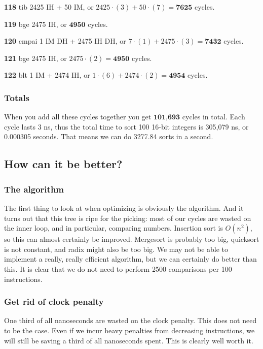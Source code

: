 \documentclass[a4paper]{article}
\begin{document}
\textbf{118} tib 2425 IH + 50 IM, or $2425 \cdot (3) + 50 \cdot (7) = \mathbf{7625}$ cycles.

\textbf{119} bge 2475 IH, or $\mathbf{4950}$ cycles.

\textbf{120} cmpai 1 IM DH + 2475 IH DH, or $7 \cdot (1) + 2475 \cdot (3) = \mathbf{7432}$ cycles.

\textbf{121} bge 2475 IH, or $2475 \cdot (2) = \mathbf{4950}$ cycles.

\textbf{122} blt 1 IM + 2474 IH, or $1 \cdot (6) + 2474 \cdot (2) = \mathbf{4954}$ cycles. \\

\subsubsection{\large Totals}

When you add all these cycles together you get $\textbf{101,693}$ cycles in total. Each cycle lasts 3 ns, thus the total time to sort 100 16-bit integers is 305,079 ns, or 0.000305 seconds. That means we can do 3277.84 sorts in a second.

\subsection{How can it be better?}

\subsubsection{The algorithm}

The first thing to look at when optimizing is obviously the algorithm. And it turns out that this tree is ripe for the picking: most of our cycles are wasted on the inner loop, and in particular, comparing numbers. Insertion sort is $O(n^2)$, so this can almost certainly be improved. Mergesort is probably too big, quicksort is not constant, and radix might also be too big. We may not be able to implement a really, really efficient algorithm, but we can certainly do better than this. It is clear that we do not need to perform 2500 comparisons per 100 instructions.

\subsubsection{Get rid of clock penalty}

One third of all nanoseconds are wasted on the clock penalty. This does not need to be the case. Even if we incur heavy penalties from decreasing instructions, we will still be saving a third of all nanoseconds spent. This is clearly well worth it.
\end{document}
